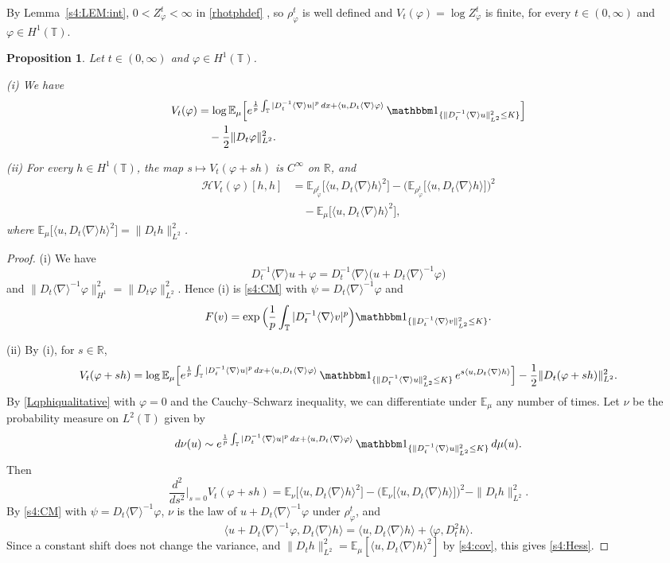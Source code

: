 \documentclass[letterpaper, 11pt,  reqno]{amsart}
\newtheorem{proposition}[theorem]{Proposition}
\theoremstyle{definition}
\newcommand{\1}{\mathbbm 1}
\newcommand{\R}{\mathbb{R}}
\newcommand{\T}{\mathbb{T}}
\renewcommand{\H}{\mathcal H}
\newcommand{\0}{\mathbf 0}
\newcommand{\E}{\mathbb{E}}
\newcommand{\nb}{\nabla}
\newcommand{\jb}[1]
{\langle #1 \rangle}
\newcommand{\ind}{\mathbbm 1}
\newcommand{\ph}{\varphi}
\renewcommand{\H}{\mathcal{H}}
\numberwithin{equation}{section}
\numberwithin{theorem}{section}
\newcommand{\WWz}[1]{e^{\frac1p\int_\T|D_t^{-1}\jb\nb u|^p\,dx+\langle u,D_t\jb\nb #1\rangle}\,\ind_{\{\|D_t^{-1}\jb\nb u\|_{L^2}^2\le K\}}}
\begin{document}
 
By Lemma~\ref{s4:LEM:int}, $0<Z^t_\ph<\infty$ in 
\eqref{rhotphdef} , so $\rho^t_\ph$ is well defined and
$V_t(\ph)=\log Z^t_\ph$ is finite, for every $t\in(0,\infty)$ and $\ph\in H^1(\T)$.
 
 
\begin{proposition}\label{s4:PROP:CM}
Let $t\in(0,\infty)$ and $\ph\in H^1(\T)$.
 
\smallskip
\noindent
{\rm (i)} We have
\begin{equation}\label{s4:VCM}
\begin{aligned}
V_t(\ph)&=\log\E_\mu\Big[\WWz{\ph}\Big]\\
&\quad-\frac12\|D_t\ph\|_{L^2}^2 .
\end{aligned}
\end{equation}
 
\smallskip
\noindent
{\rm (ii)} For every $h\in H^1(\T)$, the map $s\mapsto V_t(\ph+sh)$ is $C^\infty$ on $\R$, and
\begin{equation}\label{s4:Hess}
\begin{aligned}
\H V_t(\ph)[h,h]
&=\E_{\rho^t_\ph}\Big[\big\langle u,D_t\jb\nb h\big\rangle^2\Big]
-\Big(\E_{\rho^t_\ph}\Big[\big\langle u,D_t\jb\nb h\big\rangle\Big]\Big)^2\\
&\quad-\E_\mu\Big[\big\langle u,D_t\jb\nb h\big\rangle^2\Big],
\end{aligned}
\end{equation}
where $\E_\mu\big[\jb{u,D_t\jb\nb h}^2\big]=\|D_th\|_{L^2}^2$.
\end{proposition}
 
\begin{proof}
(i) We have
\[
D_t^{-1}\jb\nb u+\ph=D_t^{-1}\jb\nb\big(u+D_t\jb\nb^{-1}\ph\big)
\]
and $\|D_t\jb\nb^{-1}\ph\|_{H^1}^2=\|D_t\ph\|_{L^2}^2$.
Hence (i) is \eqref{s4:CM}
with $\psi=D_t\jb\nb^{-1}\ph$ and
\[
F(v)=\exp\Big(\frac1p\int_\T|D_t^{-1}\jb\nb v|^p\Big)\ind_{\{\|D_t^{-1}\jb\nb v\|^2_{L^2}\le K\}} .
\]
 
(ii) By (i), for $s\in\R$,
\[
V_t(\ph+sh)=\log\E_\mu\Big[\WWz{\ph}\,e^{s\jb{u,D_t\jb\nb h}}\Big]-\frac12\|D_t(\ph+sh)\|_{L^2}^2 .
\]
By \eqref{Lqphiqualitative} with $\ph=0$ and the Cauchy--Schwarz inequality, we can
differentiate under $\E_\mu$ any number of times. Let $\nu$ be the probability measure
on $L^2(\T)$ given by
\[
d\nu(u)\sim\WWz{\ph}\,d\mu(u).
\]
Then
\[
\frac{d^2}{ds^2}\Big|_{s=0}V_t(\ph+sh)
=\E_\nu\big[\jb{u,D_t\jb\nb h}^2\big]-\Big(\E_\nu\big[\jb{u,D_t\jb\nb h}\big]\Big)^2-\|D_th\|_{L^2}^2 .
\]
By \eqref{s4:CM} with $\psi=D_t\jb\nb^{-1}\ph$, $\nu$ is the law of $u+D_t\jb\nb^{-1}\ph$
under $\rho^t_\ph$, and
\[
\jb{u+D_t\jb\nb^{-1}\ph,D_t\jb\nb h}=\jb{u,D_t\jb\nb h}+\jb{\ph,D_t^2h}.
\]
Since a constant shift does not change the variance, and
$\|D_th\|_{L^2}^2=\E_\mu[\jb{u,D_t\jb\nb h}^2]$ by \eqref{s4:cov}, this gives \eqref{s4:Hess}.
\end{proof}
 
\end{document}
